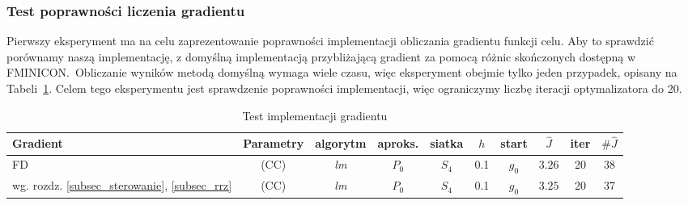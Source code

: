 \documentclass[11pt]{article}
\begin{document}
\subsubsection{Test poprawności liczenia gradientu}
Pierwszy eksperyment ma na celu zaprezentowanie poprawności implementacji obliczania gradientu funkcji celu. Aby to sprawdzić porównamy naszą implementację, z domyślną implementacją przybliżającą gradient za pomocą różnic skończonych dostępną w FMINICON.\ Obliczanie wyników metodą domyślną wymaga wiele czasu, więc eksperyment obejmie tylko jeden przypadek, opisany na Tabeli~\ref{test_tbl}. Celem tego eksperymentu jest sprawdzenie poprawności implementacji, więc ograniczymy liczbę iteracji optymalizatora do 20.
\begin{table}[h]
  \begin{center}
    \begin{tabular}{|p{1.7cm}|c|c|c|c|c|c|c|c|c|}
      \hline
      Gradient & Parametry & algorytm & aproks. & siatka & $h$ & start & $\hat{J}$ & iter & $\#\hat{J}$ \\
      \hline
      FD & (CC) & {\it lm\/} & $P_0$ & $S_4$ & 0.1 & $g_0$ & $3.26$ & 20 & 38 \\
      \hline
      wg. rozdz. \ref{subsec_sterowanie}, \ref{subsec_rrz} & (CC) & {\it lm\/} & $P_0$ & $S_4$ & 0.1 & $g_0$ & $3.25$ & 20 & 37 \\
      \hline
    \end{tabular}
    \caption{Test implementacji gradientu}\label{test_tbl}
  \end{center}
\end{table}
\end{document}
